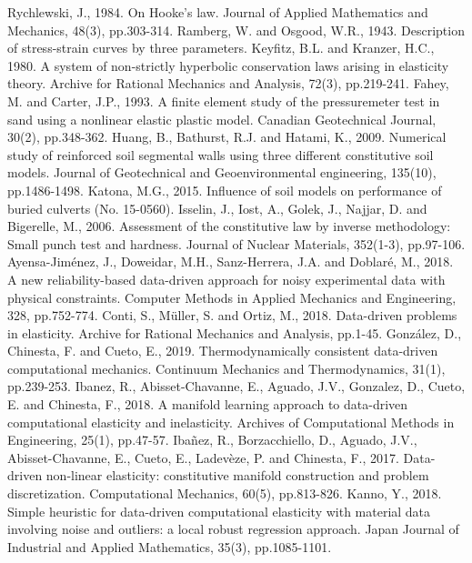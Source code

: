 \documentclass[conference]{IEEEtran}
\begin{document}
\begin{thebibliography}{00}
 Rychlewski, J., 1984. On Hooke's law. Journal of Applied Mathematics and Mechanics, 48(3), pp.303-314.
 Ramberg, W. and Osgood, W.R., 1943. Description of stress-strain curves by three parameters.
 Keyfitz, B.L. and Kranzer, H.C., 1980. A system of non-strictly hyperbolic conservation laws arising in elasticity theory. Archive for Rational Mechanics and Analysis, 72(3), pp.219-241.
 Fahey, M. and Carter, J.P., 1993. A finite element study of the pressuremeter test in sand using a nonlinear elastic plastic model. Canadian Geotechnical Journal, 30(2), pp.348-362.
 Huang, B., Bathurst, R.J. and Hatami, K., 2009. Numerical study of reinforced soil segmental walls using three different constitutive soil models. Journal of Geotechnical and Geoenvironmental engineering, 135(10), pp.1486-1498.
 Katona, M.G., 2015. Influence of soil models on performance of buried culverts (No. 15-0560).
 Isselin, J., Iost, A., Golek, J., Najjar, D. and Bigerelle, M., 2006. Assessment of the constitutive law by inverse methodology: Small punch test and hardness. Journal of Nuclear Materials, 352(1-3), pp.97-106.
 Ayensa-Jiménez, J., Doweidar, M.H., Sanz-Herrera, J.A. and Doblaré, M., 2018. A new reliability-based data-driven approach for noisy experimental data with physical constraints. Computer Methods in Applied Mechanics and Engineering, 328, pp.752-774.
 Conti, S., Müller, S. and Ortiz, M., 2018. Data-driven problems in elasticity. Archive for Rational Mechanics and Analysis, pp.1-45.
 González, D., Chinesta, F. and Cueto, E., 2019. Thermodynamically consistent data-driven computational mechanics. Continuum Mechanics and Thermodynamics, 31(1), pp.239-253.
 Ibanez, R., Abisset-Chavanne, E., Aguado, J.V., Gonzalez, D., Cueto, E. and Chinesta, F., 2018. A manifold learning approach to data-driven computational elasticity and inelasticity. Archives of Computational Methods in Engineering, 25(1), pp.47-57.
 Ibañez, R., Borzacchiello, D., Aguado, J.V., Abisset-Chavanne, E., Cueto, E., Ladevèze, P. and Chinesta, F., 2017. Data-driven non-linear elasticity: constitutive manifold construction and problem discretization. Computational Mechanics, 60(5), pp.813-826.
 Kanno, Y., 2018. Simple heuristic for data-driven computational elasticity with material data involving noise and outliers: a local robust regression approach. Japan Journal of Industrial and Applied Mathematics, 35(3), pp.1085-1101.

\end{thebibliography}
\end{document}
